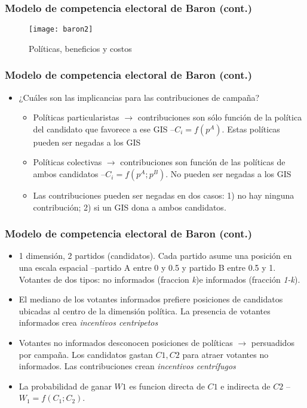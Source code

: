 \documentclass[14pt,aspectratio=169]{beamer}
\begin{document}
\begin{frame}\frametitle{Modelo de competencia electoral de Baron (cont.)}
\begin{figure}[htbp]
    \centering \vspace{-3.5cm}
    \texttt{[image: baron2]}
    \caption{Políticas, beneficios y costos}
    \label{fig:baron1}
  \end{figure}
\end{frame}


\begin{frame}\frametitle{Modelo de competencia electoral de Baron
    (cont.)}
\begin{itemize}\itemsep 15pt 
\item ¿Cuáles son las implicancias para las contribuciones de campaña? 
\begin{itemize}\itemsep 15pt \medskip
\item Políticas particularistas $\longrightarrow$ contribuciones son
  sólo función de la política del candidato que favorece a ese GIS
  --$C_{i}=f(p^{A})$. Estas políticas pueden ser negadas a los GIS
\item Políticas colectivas $\longrightarrow$ contribuciones son
  función de las políticas de ambos candidatos
  --$C_{i}=f(p^{A};p^{B})$. No pueden ser negadas a los GIS
\item Las contribuciones pueden ser negadas en dos casos: 1) no hay
  ninguna contribución; 2) si un GIS dona a ambos candidatos. 
\end{itemize}
\end{itemize}
\end{frame}




\begin{frame}\frametitle{Modelo de competencia electoral de Baron (cont.)}
\begin{itemize}\itemsep 15pt
\item 1 dimensión, 2 partidos (candidatos). Cada partido asume una
  posición en una escala espacial --partido A entre 0 y 0.5 y partido
  B entre 0.5 y 1. Votantes de dos tipos: no informados (fraccion
  \textit{k})e informados (fracción \textit{1-k}). 
\item El mediano de los votantes informados prefiere posiciones de
  candidatos ubicadas al centro de la dimensión política. La presencia de
  votantes informados crea \textit{incentivos centripetos}
\item Votantes no informados desconocen posiciones de políticas
  $\longrightarrow$ persuadidos por campaña. Los candidatos gastan
  $C1,C2$ para atraer votantes no informados. Las contribuciones crean
  \textit{incentivos centrífugos} 
\item La probabilidad de ganar $W1$ es funcion directa de $C1$ e
  indirecta de $C2$ --$W_{1}=f(C_{1};C_{2})$. 
\end{itemize}
\end{frame}
\end{document}
